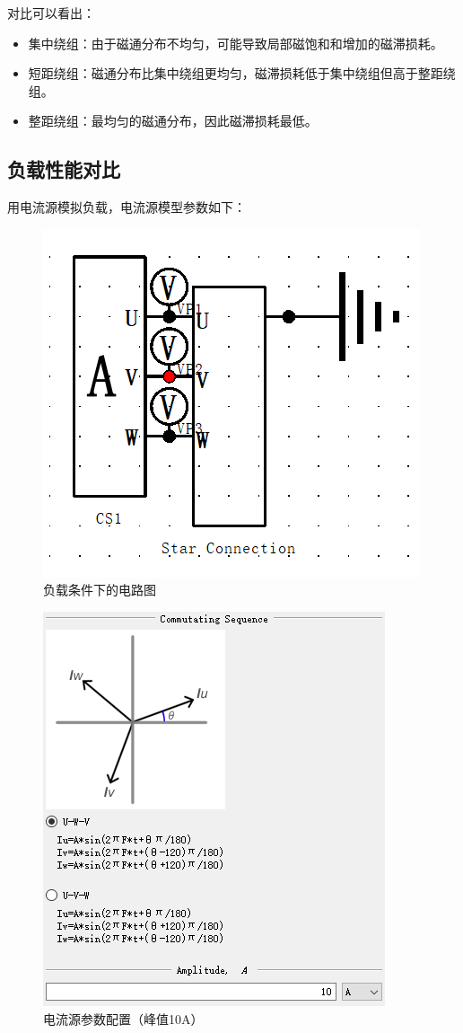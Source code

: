 \documentclass{thuemp}
\begin{document}
对比可以看出：
\begin{itemize}
	\item 集中绕组：由于磁通分布不均匀，可能导致局部磁饱和和增加的磁滞损耗。
	\item 短距绕组：磁通分布比集中绕组更均匀，磁滞损耗低于集中绕组但高于整距绕组。
	\item 整距绕组：最均匀的磁通分布，因此磁滞损耗最低。
\end{itemize}


\subsection{负载性能对比}

用电流源模拟负载，电流源模型参数如下：
\begin{figure}[H]
  \centering
  \includegraphics[width=0.8\linewidth]{./img/task2/load.png}
  \caption{负载条件下的电路图}
\end{figure}
\begin{figure}[H]
  \centering
  \includegraphics[width=0.8\linewidth]{./img/task2/load-config.png}
  \caption{电流源参数配置（峰值10A）}
\end{figure}
\end{document}
